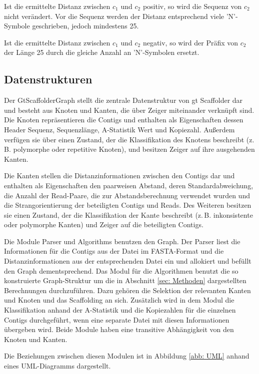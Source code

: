 \documentclass[a4paper,11pt,parskip]{scrartcl}
\begin{document}
Ist die ermittelte Distanz zwischen $c_1$ und $c_2$ positiv, so wird
die Sequenz von $c_2$ nicht verändert. Vor die Sequenz werden der
Distanz entsprechend viele 'N'-Symbole geschrieben, jedoch mindestens
25.

Ist die ermittelte Distanz zwischen $c_1$ und $c_2$ negativ, so wird
der Präfix von $c_2$ der Länge 25 durch die gleiche Anzahl an
'N'-Symbolen ersetzt.

\subsection{Datenstrukturen}
\label{sec: Datenstrukturen}

Der GtScaffolderGraph stellt die zentrale Datenstruktur von gt Scaffolder dar
und besteht aus Knoten und Kanten, die über Zeiger miteinander verknüpft sind.
Die Knoten repräsentieren die Contigs und enthalten als Eigenschaften dessen
Header Sequenz, Sequenzlänge, A-Statistik Wert und Kopiezahl. Außerdem
verfügen sie über einen Zustand, der die Klassifikation des Knotens beschreibt
(z.\,B. polymorphe oder repetitive Knoten), und besitzen Zeiger auf ihre ausgehenden
Kanten.

Die Kanten stellen die Distanzinformationen zwischen den Contigs dar und
enthalten als Eigenschaften den paarweisen Abstand, deren Standardabweichung,
die Anzahl der Read-Paare, die zur Abstandsberechnung verwendet wurden und die
Strangorientierung der beteiligten Contigs und Reads. Des Weiteren besitzen sie einen
Zustand, der die Klassifikation der Kante beschreibt (z.\,B. inkonsistente oder
polymorphe Kanten) und Zeiger auf die beteiligten Contigs.

Die Module Parser und Algorithms benutzen den Graph. Der Parser liest
die Informationen für die Contigs aus der Datei im FASTA-Format und
die Distanzinformationen aus der entsprechenden Datei ein und
allokiert und befüllt den Graph dementsprechend. Das Modul für die
Algorithmen benutzt die so konstruierte Graph-Struktur um die in
Abschnitt \ref{sec: Methoden} dargestellten Berechnungen
durchzuführen. Dazu gehören die Selektion der relevanten Kanten und
Knoten und das Scaffolding an sich. Zusätzlich wird in dem Modul die
Klassifikation anhand der A-Statistik und die Kopiezahlen für die
einzelnen Contigs durchgeführt, wenn eine separate Datei mit diesen
Informationen übergeben wird. Beide Module haben eine transitive
Abhängigkeit von den Knoten und Kanten.

Die Beziehungen zwischen diesen Modulen ist in Abbildung \ref{abb:
  UML} anhand eines UML-Diagramms dargestellt.
\end{document}
